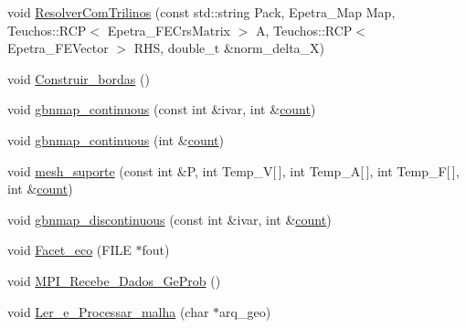 \begin{DoxyCompactItemize}
\item 
void \hyperlink{classGeProb_a479ff26c0f91f09a7b92cabf9894c64e}{Resolver\+Com\+Trilinos} (const std\+::string Pack, Epetra\+\_\+\+Map Map, Teuchos\+::\+R\+CP$<$ Epetra\+\_\+\+F\+E\+Crs\+Matrix $>$ A, Teuchos\+::\+R\+CP$<$ Epetra\+\_\+\+F\+E\+Vector $>$ R\+HS, double\+\_\+t \&norm\+\_\+delta\+\_\+X)
\item 
void \hyperlink{classGeProb_ab622a6354ec337bab6c2563049b0db4f}{Construir\+\_\+bordas} ()
\item 
void \hyperlink{classGeProb_aa2d34febad6985ceacd95ba6e10536f8}{gbnmap\+\_\+continuous} (const int \&ivar, int \&\hyperlink{classDG__Prob_a638611f0f0a04508f43ac7554bc8c7e2}{count})
\item 
void \hyperlink{classGeProb_a4a405a3f566e10cf77906d21606c97bd}{gbnmap\+\_\+continuous} (int \&\hyperlink{classDG__Prob_a638611f0f0a04508f43ac7554bc8c7e2}{count})
\item 
void \hyperlink{classGeProb_ab33e0027b5ae2b712b91690b8cb75e90}{mesh\+\_\+suporte} (const int \&P, int Temp\+\_\+V\mbox{[}$\,$\mbox{]}, int Temp\+\_\+A\mbox{[}$\,$\mbox{]}, int Temp\+\_\+F\mbox{[}$\,$\mbox{]}, int \&\hyperlink{classDG__Prob_a638611f0f0a04508f43ac7554bc8c7e2}{count})
\item 
void \hyperlink{classGeProb_a4ceec7b2e7cad8ba29dd8d751840a22b}{gbnmap\+\_\+discontinuous} (const int \&ivar, int \&\hyperlink{classDG__Prob_a638611f0f0a04508f43ac7554bc8c7e2}{count})
\item 
void \hyperlink{classGeProb_ae30b85570c7c33bb4429f9ed91532807}{Facet\+\_\+eco} (F\+I\+LE $\ast$fout)
\item 
void \hyperlink{classGeProb_a79ef11abf1d43923fb5a3613a3fa654e}{M\+P\+I\+\_\+\+Recebe\+\_\+\+Dados\+\_\+\+Ge\+Prob} ()
\item 
void \hyperlink{classGeProb_ac1030cadfbc0d88e817617a927dbc31f}{Ler\+\_\+e\+\_\+\+Processar\+\_\+malha} (char $\ast$arq\+\_\+geo)
\end{DoxyCompactItemize}
